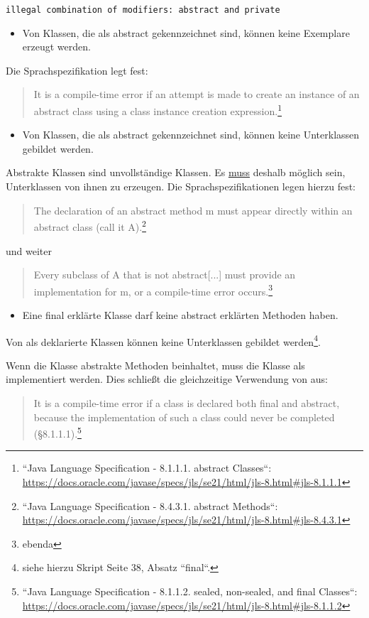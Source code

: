 \begin{lstlisting}[language=text]
illegal combination of modifiers: abstract and private
\end{lstlisting}


\begin{itemize}
    \item Von Klassen, die als abstract gekennzeichnet sind, können keine Exemplare erzeugt werden.
\end{itemize}

Die Sprachspezifikation legt fest:\blockquote{
    It is a compile-time error if an attempt is made to create an instance of an abstract class using a class instance creation expression.\footnote{
        ``Java Language Specification - 8.1.1.1. abstract Classes``: \url{https://docs.oracle.com/javase/specs/jls/se21/html/jls-8.html#jls-8.1.1.1}
    }
}

\begin{itemize}
    \item Von Klassen, die als abstract gekennzeichnet sind, können keine Unterklassen gebildet werden.
\end{itemize}

Abstrakte Klassen sind unvollständige Klassen.
Es \underline{muss} deshalb möglich sein, Unterklassen von ihnen zu erzeugen.
Die Sprachspezifikationen legen hierzu fest: \blockquote{
    The declaration of an abstract method m must appear directly within an abstract class (call it A).\footnote{
      ``Java Language Specification - 8.4.3.1. abstract Methods``: \url{https://docs.oracle.com/javase/specs/jls/se21/html/jls-8.html#jls-8.4.3.1}
    }
}

und weiter \blockquote{
    Every subclass of A that is not abstract[...] must provide an implementation for m, or a compile-time error occurs.\footnote{
       ebenda
    }
}


\begin{itemize}
    \item  Eine final erklärte Klasse darf keine abstract erklärten Methoden haben.
\end{itemize}

Von als  deklarierte Klassen können keine Unterklassen gebildet werden\footnote{
siehe hierzu Skript Seite 38, Absatz ``final``.
}.

Wenn die Klasse abstrakte Methoden beinhaltet, muss die Klasse als  implementiert werden.
Dies schließt die gleichzeitige Verwendung von 
aus:\blockquote{
    It is a compile-time error if a class is declared both final and abstract, because the implementation of such a class could never be completed (§8.1.1.1).\footnote{
        ``Java Language Specification - 8.1.1.2. sealed, non-sealed, and final Classes``: \url{https://docs.oracle.com/javase/specs/jls/se21/html/jls-8.html#jls-8.1.1.2}
    }
}
